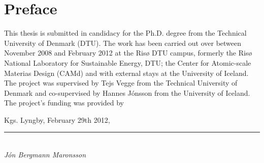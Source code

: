 \section*{Preface}

This thesis is submitted in candidacy for the Ph.D. degree from the Technical University of Denmark (DTU).
The work has been carried out over between November 2008 and February 2012 at the Ris\o{} DTU campus, formerly the Ris\o{} National Laboratory for Sustainable Energy, DTU; the Center for Atomic-scale Materias Design (CAMd) and with external stays at the University of Iceland.
The project was supervised by Tejs Vegge from the Technical University of Denmark and co-supervised by Hannes J\'onsson from the University of Iceland.
The project's funding was provided by \expand

\vspace{10mm}
\begin{flushright}
Kgs. Lyngby, February 29th 2012,\\

\vspace{15mm}

\rule{50mm}{0.1pt}\\
\textit{J\'on Bergmann Maronsson}
\end{flushright}

